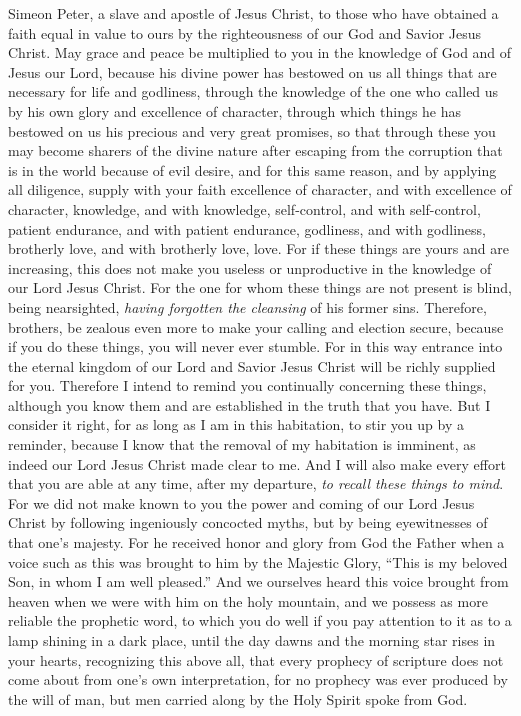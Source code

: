 
\begin{biblechapter} %
 Simeon Peter, a slave and apostle of Jesus Christ, to those who have obtained a faith equal in value to ours by the righteousness of our God and Savior Jesus Christ.
\verse May grace and peace be multiplied to you in the knowledge of God and of Jesus our Lord,
\verse because his divine power has bestowed on us all things that are necessary for life and godliness, through the knowledge of the one who called us by his own glory and excellence of character,
\verse through which things he has bestowed on us his precious and very great promises, so that through these you may become sharers of the divine nature after escaping from the corruption that is in the world because of evil desire,
\verse and for this same reason, and by applying all diligence, supply with your faith excellence of character, and with excellence of character, knowledge,
\verse and with knowledge, self-control, and with self-control, patient endurance, and with patient endurance, godliness,
\verse and with godliness, brotherly love, and with brotherly love, love.
 For if these things are yours and are increasing, this does not make you useless or unproductive in the knowledge of our Lord Jesus Christ.
\verse For the one for whom these things are not present is blind, being nearsighted, \textit{having forgotten the cleansing} of his former sins.
\verse Therefore, brothers, be zealous even more to make your calling and election secure, because if you do these things, you will never ever stumble.
\verse For in this way entrance into the eternal kingdom of our Lord and Savior Jesus Christ will be richly supplied for you.
\verse Therefore I intend to remind you continually concerning these things, although you know them and are established in the truth that you have.
\verse But I consider it right, for as long as I am in this habitation, to stir you up by a reminder,
\verse because I know that the removal of my habitation is imminent, as indeed our Lord Jesus Christ made clear to me.
\verse And I will also make every effort that you are able at any time, after my departure, \textit{to recall these things to mind}.
 For we did not make known to you the power and coming of our Lord Jesus Christ by following ingeniously concocted myths, but by being eyewitnesses of that one’s majesty.
\verse For he received honor and glory from God the Father when a voice such as this was brought to him by the Majestic Glory, “This is my beloved Son, in whom I am well pleased.”
\verse And we ourselves heard this voice brought from heaven when we were with him on the holy mountain,
\verse and we possess as more reliable the prophetic word, to which you do well if you pay attention to it as to a lamp shining in a dark place, until the day dawns and the morning star rises in your hearts,
\verse recognizing this above all, that every prophecy of scripture does not come about from one’s own interpretation,
\verse for no prophecy was ever produced by the will of man, but men carried along by the Holy Spirit spoke from God.
\end{biblechapter}


